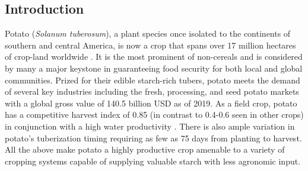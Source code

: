 \begin{refsection}
\section{Introduction}

Potato (\emph{Solanum tuberosum}), a plant species once isolated to the continents of southern and central America, is now a crop that spans over 17 million hectares of crop-land worldwide \parencite{faostat2021}. It is the most prominent of non-cereals and is considered by many a major keystone in guaranteeing food security for both local and global communities. Prized for their edible starch-rich tubers, potato meets the demand of several key industries including the fresh, processing, and seed potato markets with a global gross value of 140.5 billion USD as of 2019. As a field crop, potato has a competitive harvest index of 0.85 (in contrast to 0.4-0.6 seen in other crops) in conjunction with a high water productivity \parencite{Hay1995, Lutaladio2009}. There is also ample variation in potato's tuberization timing requiring as few as 75 days from planting to harvest. All the above make potato a highly productive crop amenable to a variety of cropping systems capable of supplying valuable starch with less agronomic input.


\end{refsection}
